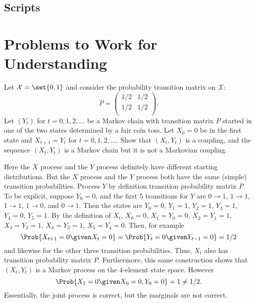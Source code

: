 \documentclass[12pt]{article}
\begin{document}
\subsection*{Scripts}



\hr

\section*{Problems to Work for Understanding}
\renewcommand{\theexerciseseries}{}
\renewcommand{\theexercise}{\arabic{exercise}}

\begin{exercise}
    Let \( \mathcal{X} = \set{0,1} \) and consider the probability
    transition matrix on \( \mathcal{X} \):
    \[
        P =
        \begin{pmatrix}
            1/2 & 1/2 \\
            1/2 & 1/2 \\
        \end{pmatrix}
        .
    \] Let \( (Y_t) \) for \( t = 0,1,2, \dots \) be a Markov chain with
    transition matrix \( P \) started in one of the two states
    determined by a fair coin toss.  Let \( X_0 = 0 \) be in the first
    state and \( X_{t+1} = Y_t \) for \( t=0, 1, 2, \dots \).  Show that
    \( (X_t, Y_t) \) is a coupling, and the sequence \( (X_t, Y_t) \) is
    a Markov chain but it is not a Markovian coupling.
\end{exercise}
\begin{solution}
    Here the \( X \) process and the \( Y \) process definitely have
    different starting distributions.  But the \( X \) process and the \(
    Y \) process both have the same (simple) transition probabilities.
    Process \( Y \) by definition transition probability matrix \( P \).
    To be explicit, suppose \( Y_0 = 0 \), and the first \( 5 \)
    transitions for \( Y \) are \( 0 \to 1 \), \( 1 \to 1 \), \( 1 \to 1
    \), \( 1 \to 0 \), and \( 0 \to 1 \).  Then the states are \( Y_0 =
    0 \), \( Y_1 = 1 \), \( Y_2 = 1 \), \( Y_3 = 1 \), \( Y_4 = 0 \), \(
    Y_5 = 1 \).  By the definition of \( X_{t} \), \( X_0 = 0 \), \( X_1
    = Y_0 = 0 \), \( X_2 = Y_1 = 1 \), \( X_3 = Y_2 = 1 \), \( X_4 = Y_3
    = 1 \), \( X_5 = Y_4 = 0 \).  Then, for example
    \[
        \Prob{X_{t+1} = 0 \given X_t = 0} = \Prob{Y_t = 0 \given Y_{t-1}
        = 0} = 1/2
    \] and likewise for the other three transition probabilities.  Thus,
    \( X_t \) also has transition probability matrix \( P \).
    Furthermore, this same construction shows that \( (X_t, Y_t) \) is a
    Markov process on the \( 4 \)-element state space.  However
    \[
        \Prob{X_{1} = 0 \given X_0 = 0, Y_0 = 0} = 1 \ne 1/2.
    \] Essentially, the joint process is correct, but the marginals are
    not correct.
\end{solution}
\end{document}
